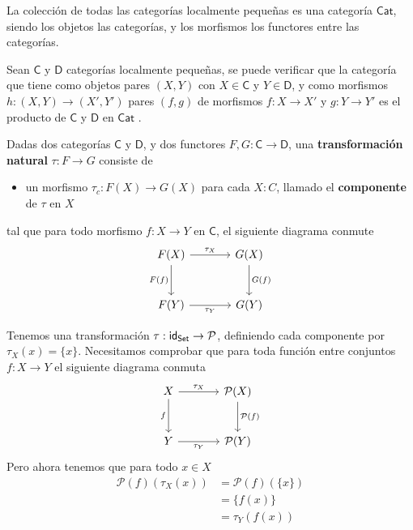 \documentclass[../main.tex]{subfiles}
\begin{document}
\begin{exampleap}
    La colecci\'on de todas las categor\'ias localmente peque\~nas es una categor\'ia $\mathsf{Cat}$, siendo los objetos las categor\'ias, y los morfismos los functores entre las categor\'ias.

    Sean $\mathsf{C}$ y $\mathsf{D}$ categor\'ias localmente peque\~nas, se puede verificar que la categor\'ia que tiene como objetos pares $(X,Y)$ con $X \in \mathsf{C}$ y $Y \in \mathsf{D}$, y como morfismos $h:(X,Y) \to (X',Y')$ pares $(f,g)$ de morfismos $f:X\to X'$ y $g:Y\to Y'$ es el producto de $\mathsf{C}$ y $\mathsf{D}$ en $\mathsf{Cat}$ \cite{mac_lane_categories_2010}.
\end{exampleap}

\begin{definitionap}
    Dadas dos categor\'ias $\mathsf{C}$ y $\mathsf{D}$, y dos functores $F,G:\mathsf{C} \to \mathsf{D}$, una \textbf{transformaci\'on natural} $\tau : F \to G$ consiste de
    \begin{itemize}
        \item un morfismo $\tau_c: F(X) \to G(X)$ para cada $X : C$, llamado el \textbf{componente} de $\tau$ en $X$
    \end{itemize}
    tal que
    para todo morfismo $f:X \to Y$ en $\mathsf{C}$, el siguiente diagrama conmute
    \[\begin{tikzcd}[row sep=large,column sep=large]
            {F(X)} & {G(X)} \\
            {F(Y)} & {G(Y)}
            \arrow["{\tau_X}", from=1-1, to=1-2]
            \arrow["{G(f)}", from=1-2, to=2-2]
            \arrow["{\tau_Y}"', from=2-1, to=2-2]
            \arrow["{F(f)}"', from=1-1, to=2-1]
        \end{tikzcd}\]
\end{definitionap}

\begin{exampleap}
    Tenemos una transformaci\'on $\tau: \idfunc[\set] \to \mathcal{P}$, definiendo cada componente por $\tau_X(x) = \{x\}$. Necesitamos comprobar que para toda funci\'on entre conjuntos $f: X \to Y$ el siguiente diagrama conmuta
    \[\begin{tikzcd}[row sep=large,column sep=large]
            {X} & {\mathcal{P}(X)} \\
            {Y} & {\mathcal{P}(Y)}
            \arrow["{\tau_X}", from=1-1, to=1-2]
            \arrow["{\mathcal{P}(f)}", from=1-2, to=2-2]
            \arrow["{\tau_Y}"', from=2-1, to=2-2]
            \arrow["{f}"', from=1-1, to=2-1]
        \end{tikzcd}\]
    Pero ahora tenemos que para todo $x \in X$
    \begin{align*}
        \mathcal{P}(f)(\tau_X(x)) & = \mathcal{P}(f)(\{x\}) \\
                                  & = \{ f(x) \}            \\
                                  & = \tau_Y(f(x))          \\
    \end{align*}
\end{exampleap}
\end{document}
